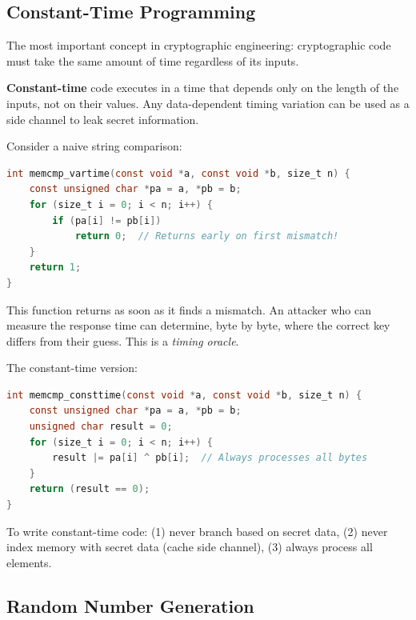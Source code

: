 \subsection{Constant-Time Programming}

The most important concept in cryptographic engineering: cryptographic code must take the same amount of time regardless of its inputs.

\begin{definition}
	\textbf{Constant-time} code executes in a time that depends only on the length of the inputs, not on their values. Any data-dependent timing variation can be used as a side channel to leak secret information.
\end{definition}

Consider a naive string comparison:

\begin{lstlisting}[language=C, caption=Variable-time comparison, label=lst:var-time]
int memcmp_vartime(const void *a, const void *b, size_t n) {
    const unsigned char *pa = a, *pb = b;
    for (size_t i = 0; i < n; i++) {
        if (pa[i] != pb[i])
            return 0;  // Returns early on first mismatch!
    }
    return 1;
}
\end{lstlisting}

This function returns as soon as it finds a mismatch. An attacker who can measure the response time can determine, byte by byte, where the correct key differs from their guess. This is a \emph{timing oracle}.

The constant-time version:

\begin{lstlisting}[language=C, caption=Constant-time comparison]
int memcmp_consttime(const void *a, const void *b, size_t n) {
    const unsigned char *pa = a, *pb = b;
    unsigned char result = 0;
    for (size_t i = 0; i < n; i++) {
        result |= pa[i] ^ pb[i];  // Always processes all bytes
    }
    return (result == 0);
}
\end{lstlisting}

\begin{principle}
	To write constant-time code: (1) never branch based on secret data, (2) never index memory with secret data (cache side channel), (3) always process all elements.
\end{principle}

\subsection{Random Number Generation}

